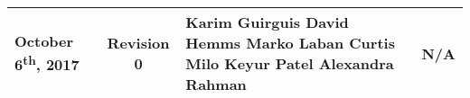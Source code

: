 \documentclass [11pt]{article}
\begin{document}
\begin{longtable}{| p{ } | p{ } | p{ } | p{ } |}
%
%
%
\multirow{5}{*}{\centering October 6\textsuperscript{th}, 2017}  & 
\multicolumn{1}{c|}{\multirow{5}{*}{Revision 0}}& 
{Karim Guirguis \newline
David Hemms \newline
Marko Laban \newline
Curtis Milo \newline
Keyur Patel \newline
Alexandra Rahman}
&
 \multicolumn{1}{c|}{\multirow{5}{*}{N/A}} \\ 
\hline 

\end{longtable}
\end{document}
